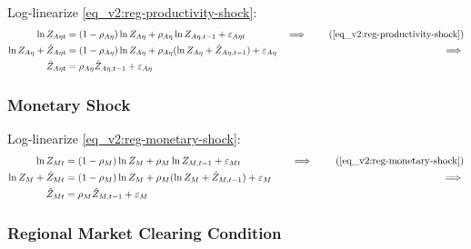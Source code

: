 \documentclass[../thesis.tex]{subfiles}
\begin{document}
Log-linearize \ref{eq_v2:reg-productivity-shock}:
\begin{alignat}{2}
	\ln{Z_{A\eta t}} &= (1-\rho_{A\eta})\ln{Z_{A\eta}} + \rho_{A\eta}\ln{Z_{A\eta,t-1}} + \varepsilon_{A\eta t} &\implies \tag{\ref{eq_v2:reg-productivity-shock}} \\
	\ln{Z_{A\eta}} + \hat{Z}_{A\eta t} &= (1-\rho_{A\eta}) \ln{Z_{A\eta}} + \rho_{A\eta} (\ln{Z_{A\eta}} + \hat{Z}_{A\eta, t-1}) + \varepsilon_{A\eta} &\implies \nonumber \\
	\hat{Z}_{A\eta t} &= \rho_{A\eta} \hat{Z}_{A\eta, t-1} + \varepsilon_{A\eta} \label{eq_v2:reg-ll-productivity-shock}
\end{alignat}


\subsubsection*{Monetary Shock}

Log-linearize \ref{eq_v2:reg-monetary-shock}:
\begin{alignat}{2}
	\ln{Z_{Mt}} &= (1-\rho_M)\ln{Z_M} + \rho_M\ln{Z_{M,t-1}} + \varepsilon_{Mt} &\implies \tag{\ref{eq_v2:reg-monetary-shock}} \\
	\ln{Z_{M}} + \hat{Z}_{Mt} &= (1-\rho_M) \ln{Z_M} + \rho_M (\ln{Z_{M}} + \hat{Z}_{M,t-1}) + \varepsilon_{M} \quad &\implies \nonumber \\
	\hat{Z}_{Mt} &= \rho_M \hat{Z}_{M,t-1} + \varepsilon_{M} \label{eq_v2:reg-ll-monetary-shock}
\end{alignat}


\subsubsection*{Regional Market Clearing Condition}
\end{document}
